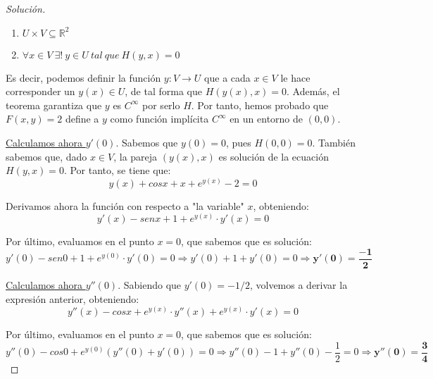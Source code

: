 \begin{ejer}
\begin{proof}[Solución]
\begin{enumerate}
\item $U\times V \subseteq \mathbb{R}^2$
\item $\forall x \in V \ \exists ! \ y \in U\ tal\ que \ H(y,x) = 0$
\end{enumerate}

Es decir, podemos definir la función $y:V \longrightarrow U$ que a cada $x\in V$ le hace corresponder un $y(x)\in U$, de tal forma que $H(y(x),x) = 0$. Además, el teorema garantiza que $y$ es $C^{\infty}$ por serlo $H$. Por tanto, hemos probado que $F(x,y)=2$ define a $y$ como función implícita $C^{\infty}$ en un entorno de $(0,0)$.

\underline{Calculamos ahora $y'(0)$}. Sabemos que $y(0)=0$, pues $H(0,0) = 0$. También sabemos que, dado $x\in V$, la pareja $(y(x),x)$ es solución de la ecuación $H(y,x)=0$. Por tanto, se tiene que:
\vspace{0.5em}
$$y(x) + cosx + x + e^{y(x)} - 2 = 0$$

Derivamos ahora la función con respecto a "la variable" $x$, obteniendo:
\vspace{0.5em}
$$y'(x) - senx + 1 + e^{y(x)}\cdot y'(x) = 0$$

Por último, evaluamos en el punto $x=0$, que sabemos que es solución:
$$y'(0) - sen0 + 1 + e^{y(0)}\cdot y'(0) = 0 \Rightarrow y'(0) + 1 + y'(0) = 0 \Rightarrow \bm{y'(0) = \frac{-1}{2}}$$

\underline{Calculamos ahora $y''(0)$}. Sabiendo que $y'(0) = -1/2$, volvemos a derivar la expresión anterior, obteniendo:
\vspace{0.5em}
$$y''(x) - cosx + e^{y(x)}\cdot y''(x) + e^{y(x)}\cdot y'(x)= 0$$

Por último, evaluamos en el punto $x=0$, que sabemos que es solución:
$$y''(0) - cos0 + e^{y(0)}\left( y''(0) + y'(0) \right) = 0 \Rightarrow y''(0) - 1 + y''(0) - \frac{1}{2} = 0 \Rightarrow \bm{y''(0) = \frac{3}{4}}$$
\end{proof}
\end{ejer}

